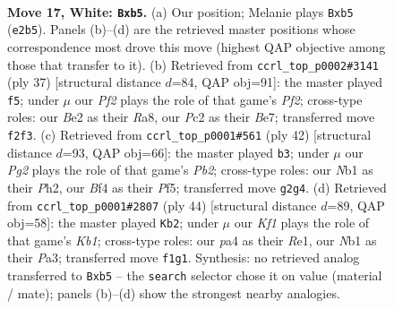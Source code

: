 \documentclass[11pt]{article}
\begin{document}
\clearpage

\begin{figure}[p]\centering
\begin{subfigure}{0.46\textwidth}\centering
\resizebox{\linewidth}{!}{%
\newchessgame
\chessboard[
  setfen={rnbr1k2/5pb1/2p3p1/1p2N3/p3nB1p/P7/RPP1BPPP/1N2RK2 w - - 0 17},
  showmover=false,
  pgfstyle=straightmove, color=movearrow, markmove={e2-b5}
]}
\caption{}
\end{subfigure}\hfill
\begin{subfigure}{0.46\textwidth}\centering
\resizebox{\linewidth}{!}{%
\newchessgame
\chessboard[
  setfen={r3k2r/1p2bppp/2p1p3/3bN3/p2Pn3/6P1/PP2PPBP/R1R1B1K1 b kq - 2 19},
  showmover=false,
  pgfstyle=straightmove, color=movearrow, markmove={f7-f5}
]}
\caption{}
\end{subfigure}
\\[4pt]
\begin{subfigure}{0.46\textwidth}\centering
\resizebox{\linewidth}{!}{%
\newchessgame
\chessboard[
  setfen={2r1kb1r/5pp1/p2p1nPp/3PpP2/2N5/P3B3/1PP4P/2KR3R w k - 3 22},
  showmover=false,
  pgfstyle=straightmove, color=movearrow, markmove={b2-b3}
]}
\caption{}
\end{subfigure}\hfill
\begin{subfigure}{0.46\textwidth}\centering
\resizebox{\linewidth}{!}{%
\newchessgame
\chessboard[
  setfen={1r2k2r/1b2bpp1/p2ppn2/1p6/1P1BPP2/P1NB2P1/2P5/1K1RR3 w k - 0 23},
  showmover=false,
  pgfstyle=straightmove, color=movearrow, markmove={b1-b2}
]}
\caption{}
\end{subfigure}
\caption{\textbf{Move 17, White: \texttt{Bxb5}.} (a) Our position; Melanie plays \texttt{Bxb5} (\texttt{e2b5}). Panels (b)--(d) are the retrieved master positions whose correspondence most drove this move (highest QAP objective among those that transfer to it). (b) Retrieved from \texttt{ccrl\_top\_p0002\#3141} (ply 37) [structural distance $d$=84, QAP obj=91]: the master played \texttt{f5}; under $\mu$ our \emph{Pf2} plays the role of that game's \emph{Pf2}; cross-type roles: our \emph{B}e2 as their \emph{R}a8, our \emph{P}c2 as their \emph{B}e7; transferred move \texttt{f2f3}. (c) Retrieved from \texttt{ccrl\_top\_p0001\#561} (ply 42) [structural distance $d$=93, QAP obj=66]: the master played \texttt{b3}; under $\mu$ our \emph{Pg2} plays the role of that game's \emph{Pb2}; cross-type roles: our \emph{N}b1 as their \emph{P}h2, our \emph{B}f4 as their \emph{P}f5; transferred move \texttt{g2g4}. (d) Retrieved from \texttt{ccrl\_top\_p0001\#2807} (ply 44) [structural distance $d$=89, QAP obj=58]: the master played \texttt{Kb2}; under $\mu$ our \emph{Kf1} plays the role of that game's \emph{Kb1}; cross-type roles: our \emph{p}a4 as their \emph{R}e1, our \emph{N}b1 as their \emph{P}a3; transferred move \texttt{f1g1}. Synthesis: no retrieved analog transferred to \texttt{Bxb5} -- the \texttt{search} selector chose it on value (material / mate); panels (b)--(d) show the strongest nearby analogies.}
\label{fig:thought-m32}
\end{figure}
\end{document}
